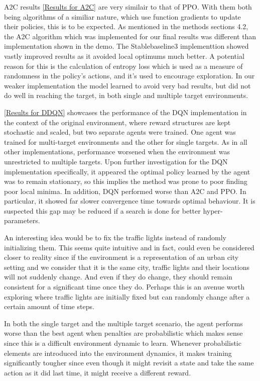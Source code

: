 \documentclass{article}
\begin{document}
	A2C results \ref{Results for A2C} are very similair to that of PPO. With them both being algorithms of a similiar nature, which use function gradients to update their policies, this is to be expected. As mentioned in the methods sections 4.2, the A2C algorithm which was implemented for our final results was different than implementation shown in the demo. The Stablebaseline3 implementtion showed vastly improved results as it avoided local optimums much better. A potential reason for this is the calculation of entropy loss which is used as a measure of randomness in the policy's actions, and it's used to encourage exploration. In our weaker implementation the model learned to avoid very bad results, but did not do well in reaching the target, in both single and multiple target environments.    
		
	\ref{Results for DDQN} showcases the performance of the DQN implementation in the context of the original environment, where reward structures are kept stochastic and scaled, but two separate agents were trained. One agent was trained for multi-target environments and the other for single targets. As in all other implementations, performance worsened when the environment was unrestricted to multiple targets. Upon further investigation for the DQN implementation specifically, it appeared the optimal policy learned by the agent was to remain stationary, so this implies the method was prone to poor finding poor local minima. In addition, DQN performed worse than A2C and PPO. In particular, it showed far slower convergence time towards optimal behaviour. It is suspected this gap may be reduced if a search is done for better hyper-parameters.
	
	An interesting idea would be to fix the traffic lights instead of randomly initializing them. This seems quite intuitive and in fact, could even be considered closer to reality since if the environment is a representation of an urban city setting and we consider that it is the same city, traffic lights and their locations will not suddenly change. And even if they do change, they should remain consistent for a significant time once they do. Perhaps this is an avenue worth exploring where traffic lights are initially fixed but can randomly change after a certain amount of time steps. 
	
	In both the single target and the multiple target scenario, the agent performs worse than the best agent when penalties are probabilistic which makes sense since this is a difficult environment dynamic to learn. Whenever probabilistic elements are introduced into the environment dynamics, it makes training significantly tougher since even though it might revisit a state and take the same action as it did last time, it might receive a different reward.
	
\end{document}
